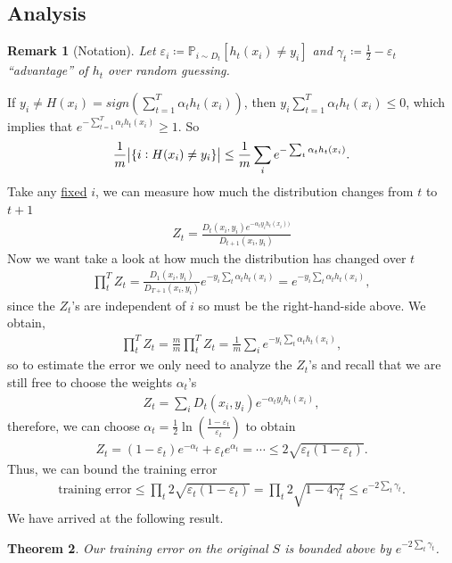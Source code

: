 \documentclass[12pt, letterpaper]{article}
\numberwithin{equation}{section} %
\newcommand{\ul}{\underline}
\newcommand{\mb}{\mathbb}
\newcommand{\ve}{\varepsilon}
\newtheorem{theorem}{Theorem}[section]
\newtheorem{remark}[theorem]{Remark}
\theoremstyle{definition}
\theoremstyle{remark}
\begin{document}
\subsection*{Analysis}
\begin{remark}[Notation]
Let $\ve_i \coloneqq \mb P_{i\sim D_t}[h_t(x_i)\ne y_i]$ and $\gamma_t \coloneqq \frac12 -\ve_t$ ``advantage'' of $h_t$ over random guessing.
\end{remark}
If $y_i\ne H(x_i) = sign\left(\sum_{t=1}^T\alpha_th_t(x_i)\right)$, then $y_i\sum_{t=1}^T\alpha_th_t(x_i) \leq 0$, which implies that $e^{-\sum_{t=1}^T\alpha_th_t(x_i)}\geq 1$. So
\begin{align}\label{star}
\frac1m\abs{\lbrace i : H(x_i) \ne y_i \rbrace} \leq \frac1m \sum_ie^{-\sum_t\alpha_th_t(x_i)}.
\end{align}
Take any \ul{fixed} $i$, we can measure how much the distribution changes from $t$ to $t+1$
\begin{align}
 Z_t = \frac{D_t(x_i, y_i)e^{-\alpha_ty_ih_t(x_i))}}{D_{t+1}(x_i, y_i)}
\end{align}
Now we want take a look at how much the distribution has changed over $t$
\begin{align}
\prod_{t}^T Z_t = \frac{D_1(x_i, y_i)}{D_{T+1}(x_i, y_i)} e^{-y_i\sum_t\alpha_th_t(x_i)} = e^{-y_i\sum_t\alpha_th_t(x_i)},
\end{align}
since the $Z_t$'s are independent of $i$ so must be the right-hand-side above. We obtain,
\begin{align}
\prod_{t}^T Z_t = \frac mm \prod_{t}^T Z_t = \frac1 m \sum_i e^{-y_i\sum_t\alpha_th_t(x_i)},
\end{align}
so to estimate the error we only need to analyze the $Z_t$'s and recall that we are still free to choose the weights $\alpha_t$'s
\begin{align}
Z_t = \sum_i D_t(x_i, y_i)e^{-\alpha_ty_ih_t(x_i)},
\end{align}
therefore, we can choose $\alpha_t = \frac12 \ln\left(\frac{1-\ve_t}{\ve_t}\right)$ to obtain
\begin{align}
Z_t = (1-\ve_t)e^{-\alpha_t} + \ve_te^{\alpha_t} = \cdots \leq 2\sqrt{\ve_t(1-\ve_t)}.
\end{align}
Thus, we can bound the training error
\begin{align}
\textrm{training error} \leq \prod_t2\sqrt{\ve_t(1-\ve_t)} = \prod_t2\sqrt{1 - 4\gamma_t^2} \leq e^{-2\sum_t\gamma_t}.
\end{align}
We have arrived at the following result.
\begin{theorem}
Our training error on the original $S$ is bounded above by  $e^{-2\sum_t\gamma_t}$.
\end{theorem}
\end{document}
